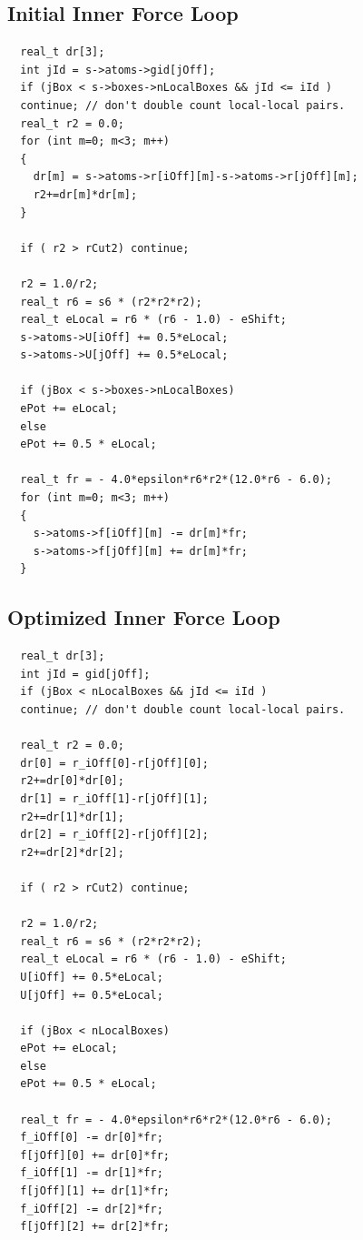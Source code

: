 \documentclass[12pt]{article}
\begin{document}
\subsection{Initial Inner Force Loop}
\begin{lstlisting}
  real_t dr[3];
  int jId = s->atoms->gid[jOff];  
  if (jBox < s->boxes->nLocalBoxes && jId <= iId )
  continue; // don't double count local-local pairs.
  real_t r2 = 0.0;
  for (int m=0; m<3; m++)
  {
    dr[m] = s->atoms->r[iOff][m]-s->atoms->r[jOff][m];
    r2+=dr[m]*dr[m];
  }

  if ( r2 > rCut2) continue;

  r2 = 1.0/r2;
  real_t r6 = s6 * (r2*r2*r2);
  real_t eLocal = r6 * (r6 - 1.0) - eShift;
  s->atoms->U[iOff] += 0.5*eLocal;
  s->atoms->U[jOff] += 0.5*eLocal;

  if (jBox < s->boxes->nLocalBoxes)
  ePot += eLocal;
  else
  ePot += 0.5 * eLocal;

  real_t fr = - 4.0*epsilon*r6*r2*(12.0*r6 - 6.0);
  for (int m=0; m<3; m++)
  {
    s->atoms->f[iOff][m] -= dr[m]*fr;
    s->atoms->f[jOff][m] += dr[m]*fr;
  }
\end{lstlisting}

\subsection{Optimized Inner Force Loop}
\begin{lstlisting}
  real_t dr[3];
  int jId = gid[jOff];  
  if (jBox < nLocalBoxes && jId <= iId )
  continue; // don't double count local-local pairs.

  real_t r2 = 0.0;
  dr[0] = r_iOff[0]-r[jOff][0];
  r2+=dr[0]*dr[0];
  dr[1] = r_iOff[1]-r[jOff][1];
  r2+=dr[1]*dr[1];
  dr[2] = r_iOff[2]-r[jOff][2];
  r2+=dr[2]*dr[2];

  if ( r2 > rCut2) continue;

  r2 = 1.0/r2;
  real_t r6 = s6 * (r2*r2*r2);
  real_t eLocal = r6 * (r6 - 1.0) - eShift;
  U[iOff] += 0.5*eLocal;
  U[jOff] += 0.5*eLocal;

  if (jBox < nLocalBoxes)
  ePot += eLocal;
  else
  ePot += 0.5 * eLocal;

  real_t fr = - 4.0*epsilon*r6*r2*(12.0*r6 - 6.0);
  f_iOff[0] -= dr[0]*fr;
  f[jOff][0] += dr[0]*fr;
  f_iOff[1] -= dr[1]*fr;
  f[jOff][1] += dr[1]*fr;
  f_iOff[2] -= dr[2]*fr;
  f[jOff][2] += dr[2]*fr;
\end{lstlisting}
\end{document}
